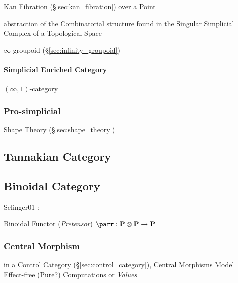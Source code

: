 Kan Fibration (\S\ref{sec:kan_fibration}) over a Point

abstraction of the Combinatorial structure found in the Singular
Simplicial Complex of a Topological Space %

$\infty$-groupoid (\S\ref{sec:infinity_groupoid})



\paragraph{Simplicial Enriched Category}\hfill
\label{sec:simplicial_enriched}

$(\infty,1)$-category %



\subsubsection{Pro-simplicial}\label{sec:pro_simplicial}

Shape Theory (\S\ref{sec:shape_theory})



\subsection{Tannakian Category}\label{sec:tannakian_category}

\subsection{Binoidal Category}\label{sec:binoidal_category}

Selinger01 \cite{selinger01}:

Binoidal Functor (\emph{Pretensor}) $\parr : \cat{P} \otimes \cat{P}
\rightarrow \cat{P}$



\subsubsection{Central Morphism}\label{sec:central_morphism}

in a Control Category (\S\ref{sec:control_category}), Central
Morphisms Model Effect-free (Pure?) Computations or \emph{Values}


